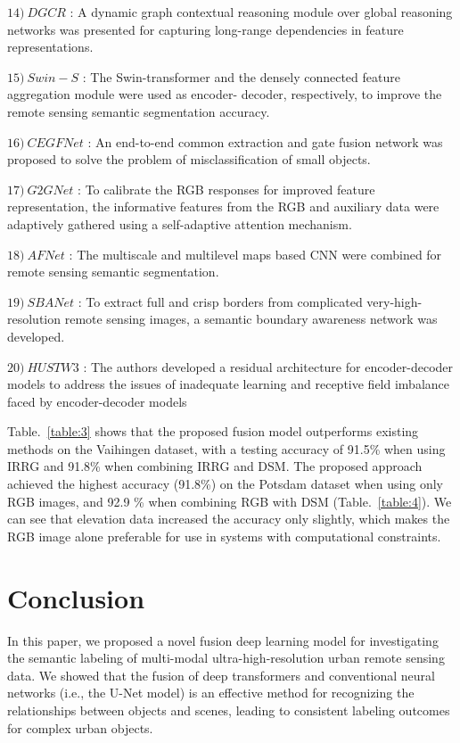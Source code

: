 \documentclass[journal]{IEEEtran}
\begin{document}
$14)~DGCR$ \cite{9690154}: A dynamic graph contextual reasoning module over global reasoning networks was presented for capturing long-range dependencies in feature representations.

$15)~Swin-S$ \cite{9681903}: The Swin-transformer and the densely connected feature aggregation module were used as encoder- decoder, respectively, to improve the remote sensing semantic segmentation accuracy. 

$16)~CEGFNet$ \cite{9538389}: An end-to-end common extraction and gate fusion network was proposed to solve the problem of misclassification of small objects. 

$17)~G2GNet$ \cite{9519842}: To calibrate the RGB responses for improved feature representation, the informative features from the RGB and auxiliary data were adaptively gathered using a self-adaptive attention mechanism. 

$18)~AFNet$ \cite{9258402}:  The multiscale and multilevel maps based CNN were combined for remote sensing semantic segmentation. 

$19)~SBANet$ \cite{9345482}:  To extract full and crisp borders from complicated very-high-resolution remote sensing images, a semantic boundary awareness network was developed.

$20)~ HUSTW3$ \cite{rs10091429}: The authors developed a residual architecture for encoder-decoder models to address the issues of inadequate learning and receptive field imbalance faced by encoder-decoder models 

Table.~\ref{table:3} shows that the proposed fusion model outperforms existing methods on the Vaihingen dataset, with a testing accuracy of 91.5\% when using IRRG and 91.8\% when combining IRRG and DSM. 
The proposed approach achieved the highest accuracy (91.8\%) on the Potsdam dataset when using only RGB images, and 92.9 \% when combining RGB with DSM (Table.~\ref{table:4}). We can see that elevation data increased the accuracy only slightly, which makes the RGB image alone preferable for use in systems with computational constraints.
\section{Conclusion}
In this paper, we proposed a novel fusion deep learning model for investigating the semantic labeling of multi-modal ultra-high-resolution urban remote sensing data. We showed that the fusion of deep transformers and conventional neural networks (i.e., the U-Net model) is an effective method for recognizing the relationships between objects and scenes, leading to consistent labeling outcomes for complex urban objects.
\end{document}
